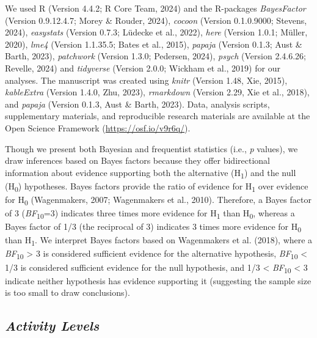 \documentclass[
  pub]{apa6}
\begin{document}
We used R (Version 4.4.2; R Core Team, 2024) and the R-packages \emph{BayesFactor} (Version 0.9.12.4.7; Morey \& Rouder, 2024), \emph{cocoon} (Version 0.1.0.9000; Stevens, 2024), \emph{easystats} (Version 0.7.3; Lüdecke et al., 2022), \emph{here} (Version 1.0.1; Müller, 2020), \emph{lme4} (Version 1.1.35.5; Bates et al., 2015), \emph{papaja} (Version 0.1.3; Aust \& Barth, 2023), \emph{patchwork} (Version 1.3.0; Pedersen, 2024), \emph{psych} (Version 2.4.6.26; Revelle, 2024) and \emph{tidyverse} (Version 2.0.0; Wickham et al., 2019) for our analyses. The manuscript was created using \emph{knitr} (Version 1.48, Xie, 2015), \emph{kableExtra} (Version 1.4.0, Zhu, 2023), \emph{rmarkdown} (Version 2.29, Xie et al., 2018), and \emph{papaja} (Version 0.1.3, Aust \& Barth, 2023). Data, analysis scripts, supplementary materials, and reproducible research materials are available at the Open Science Framework (\url{https://osf.io/v9r6q/}).

Though we present both Bayesian and frequentist statistics (i.e., \emph{p} values), we draw inferences based on Bayes factors because they offer bidirectional information about evidence supporting both the alternative (H\textsubscript{1}) and the null (H\textsubscript{0}) hypotheses. Bayes factors provide the ratio of evidence for H\textsubscript{1} over evidence for H\textsubscript{0} (Wagenmakers, 2007; Wagenmakers et al., 2010). Therefore, a Bayes factor of 3 (\emph{BF}\textsubscript{10}=3) indicates three times more evidence for H\textsubscript{1} than H\textsubscript{0}, whereas a Bayes factor of 1/3 (the reciprocal of 3) indicates 3 times more evidence for H\textsubscript{0} than H\textsubscript{1}. We interpret Bayes factors based on Wagenmakers et al. (2018), where a \emph{BF}\textsubscript{10} \textgreater{} 3 is considered sufficient evidence for the alternative hypothesis, \emph{BF}\textsubscript{10} \textless{} 1/3 is considered sufficient evidence for the null hypothesis, and 1/3 \textless{} \emph{BF}\textsubscript{10} \textless{} 3 indicate neither hypothesis has evidence supporting it (suggesting the sample size is too small to draw conclusions).

\subsection{\texorpdfstring{\emph{Activity Levels}}{Activity Levels}}\label{activity-levels-1}
\end{document}
